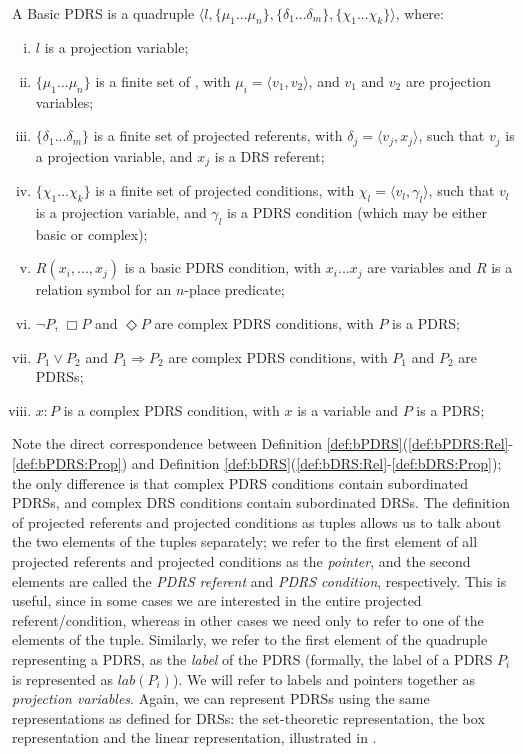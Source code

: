 \begin{definition} \label{def:bPDRS}~\\
A Basic PDRS is a quadruple $\langle l, \{\mu_1 ... \mu_n\}, 
\{\delta_1 ... \delta_m\}, \{\chi_1 ... \chi_k\}\rangle$, where:
  \begin{enumerate}[i.]
    \item $l$ is a projection variable;
    \item $\{\mu_1 ... \mu_n\}$ is a finite set of \MAPs, with $\mu_i=\langle
      v_1,v_2\rangle$, and  $v_1$ and $v_2$ are projection variables;
    \item $\{\delta_1 ... \delta_m\}$ is a finite set of projected
      referents, with $\delta_j=\langle v_j, x_j\rangle$, such that $v_j$ is
      a projection variable, and $x_j$ is a DRS referent;
    \item $\{\chi_1 ... \chi_k\}$ is a finite set of projected conditions,
      with $\chi_l = \langle v_l,\gamma_l\rangle$, such that $v_l$ is a
      projection variable, and $\gamma_l$ is a PDRS condition (which may be
      either basic or complex);
    \item \label{def:bPDRS:Rel} $R(x_i, ..., x_j)$ is a basic PDRS condition,
      with $x_i ... x_j$ are variables and $R$ is a relation symbol for an
      $n$-place predicate;
    \item $\neg P$, $\Box P$ and $\Diamond P$ are complex PDRS conditions,
      with $P$ is a PDRS;
    \item $P_1 \vee P_2$ and $P_1 \Rightarrow P_2$ are complex PDRS
      conditions, with $P_1$ and $P_2$ are PDRSs;
    \item\label{def:bPDRS:Prop} $x:P$ is a complex PDRS condition, with $x$
      is a variable and $P$ is a PDRS;
  \end{enumerate}
\end{definition}

\noindent Note the direct correspondence between Definition
\ref{def:bPDRS}(\ref{def:bPDRS:Rel}-\ref{def:bPDRS:Prop}) and Definition
\ref{def:bDRS}(\ref{def:bDRS:Rel}-\ref{def:bDRS:Prop}); the only difference
is that complex PDRS conditions contain subordinated PDRSs, and complex DRS
conditions contain subordinated DRSs.  The definition of projected referents
and projected conditions as tuples allows us to talk about the two elements
of the tuples separately; we refer to the first element of all projected
referents and projected conditions as the \textit{pointer}, and the second
elements are called the \textit{PDRS referent} and \textit{PDRS condition},
respectively. This is useful, since in some cases we are interested in the
entire projected referent/condition, whereas in other cases we need only to
refer to one of the elements of the tuple. Similarly, we refer to the first
element of the quadruple representing a PDRS, as the \textit{label} of the
PDRS (formally, the label of a PDRS $P_i$ is represented as $lab(P_i)$).
We will refer to labels and pointers together as \textit{projection
variables}.  Again, we can represent PDRSs using the same representations as
defined for DRSs: the set-theoretic representation, the box representation
and the linear representation, illustrated in \Next.


